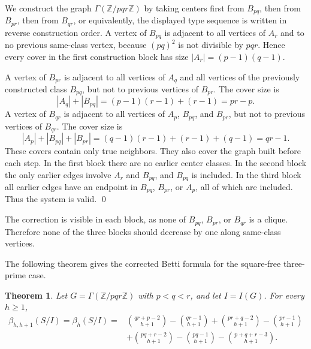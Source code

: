 \documentclass[12pt]{article}
\newtheorem{theorem}{Theorem}[section]
\theoremstyle{definition}
\renewenvironment{proof}{{\bf \noindent Proof.}}{\qed}
\begin{document}
\begin{proof}
We construct the graph $\Gamma(\mathbb{Z}/pqr\mathbb{Z})$ by taking centers first from $B_{pq}$, then from $B_{pr}$, then from $B_{qr}$, or equivalently, the displayed type sequence is written in reverse construction order.  A vertex of $B_{pq}$ is adjacent to all vertices of $A_r$ and to no previous same-class vertex, because $(pq)^2$ is not divisible by $pqr$.  Hence every cover in the first construction block has size $|A_r|=(p-1)(q-1)$.

\medskip

A vertex of $B_{pr}$ is adjacent to all vertices of $A_q$ and all vertices of the previously constructed class $B_{pq}$, but not to previous vertices of $B_{pr}$.  The cover size is
$$
|A_q|+|B_{pq}|=(p-1)(r-1)+(r-1)=pr-p.
$$
A vertex of $B_{qr}$ is adjacent to all vertices of $A_p$, $B_{pq}$, and $B_{pr}$, but not to previous vertices of $B_{qr}$.  The cover size is
$$
|A_p|+|B_{pq}|+|B_{pr}|=(q-1)(r-1)+(r-1)+(q-1)=qr-1.
$$
These covers contain only true neighbors.  They also cover the graph built before each step. In the first block there are no earlier center classes. In the second block the only earlier edges involve $A_r$ and $B_{pq}$, and $B_{pq}$ is included. In the third block all earlier edges have an endpoint in $B_{pq}$, $B_{pr}$, or $A_p$, all of which are included.  Thus the system is valid.
\end{proof}

\medskip

The correction is visible in each block, as none of $B_{pq}$, $B_{pr}$, or $B_{qr}$ is a clique.  Therefore none of the three blocks should decrease by one along same-class vertices.

\medskip

\noindent The following theorem gives the corrected Betti formula for the square-free three-prime case.
\begin{theorem}\label{thm:three-prime-betti}
Let $G=\Gamma(\mathbb{Z}/pqr\mathbb{Z})$ with $p<q<r$, and let $I=I(G)$.  For every $h\geq 1$,
$$
\begin{aligned}
\beta_{h,h+1}(S/I)=\beta_h(S/I)
={}&\binom{qr+p-2}{h+1}-\binom{qr-1}{h+1} +\binom{pr+q-2}{h+1}-\binom{pr-1}{h+1}\\
&+\binom{pq+r-2}{h+1}-\binom{pq-1}{h+1} -\binom{p+q+r-3}{h+1}.
\end{aligned}
$$
\end{theorem}
\end{document}
